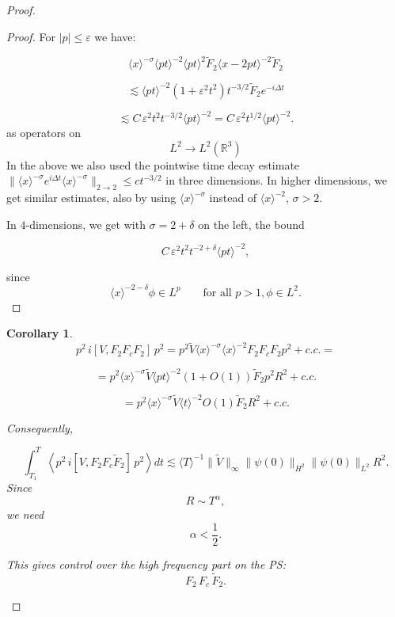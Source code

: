 \documentclass[11pt]{article}
\newtheorem{corollary}[theorem]{Corollary}
\begin{document}
\begin{proof}
\begin{proof}
For $|p|\le \varepsilon$ we have:

\[
\langle x\rangle^{-\sigma}\langle pt\rangle^{-2}\langle pt\rangle^{2}\widetilde F_2\langle x-2pt\rangle^{-2}\widetilde F_2
\]

\[
\lesssim\langle pt\rangle^{-2}(1+\varepsilon^2 t^2)t^{-3/2}\widetilde F_2e^{-i\Delta t}
\]


\[
\lesssim C\,\varepsilon^2t^2t^{-3/2}\langle pt\rangle^{-2}=C\,\varepsilon^{2}t^{1/2}\langle pt\rangle^{-2}.
\]
as operators on
\[
L^2 \to L^2(\mathbb{R}^3)
\]
In the above we also used the pointwise time decay estimate $\|\langle x\rangle^{-\sigma} e^{i\Delta t}\langle x\rangle^{-\sigma}\|_{2\rightarrow 2} \leq ct^{-3/2}$ in three dimensions.
In higher dimensions, we get similar estimates,
also by using $\langle x\rangle^{-\sigma}$ instead of
$\langle x\rangle^{-2}$, $\sigma>2$.

In $4$-dimensions, we get with
$\sigma=2+\delta$ on the left, the bound

\[
C\,\varepsilon^2t^2t^{-2+\delta}\langle pt\rangle^{-2},
\]

since
\[
\langle x\rangle^{-2-\delta}\phi\in L^p\qquad\text{for all } p>1, \phi \in L^2.
\]
\end{proof}
\begin{corollary}

\begin{equation}
p^2\,i[V,F_2F_c F_2]\,p^2
=
p^2
\widetilde V
\langle x\rangle^{-\sigma}
\langle x\rangle^{-2} F_2 F_c  F_2 p^2+c.c.=
\end{equation}

\[
=p^2\langle x\rangle^{-\sigma}\widetilde V\langle pt\rangle^{-2}(1+O(1))\widetilde F_2p^2R^2+c.c.
\]

\[
=p^2\langle x\rangle^{-\sigma}\widetilde V\langle t\rangle^{-2}O(1)\widetilde F_2R^2+c.c.
\]

Consequently,

\begin{equation}
\int_{T_1}^{T}\left<p^2\,i[V,F_2F_c\widetilde F_2]\,p^2\right>dt\lesssim\langle T\rangle^{-1}\|\widetilde V\|_{\infty}\|\psi(0)\|_{H^2}\|\psi(0)\|_{L^2}R^2.
\end{equation}
Since
\[
R\sim T^\alpha,
\]
we need
\[
\alpha<\frac12.
\]

This gives control over the high frequency
part on the PS:
\[
F_2\,F_c\,\widetilde F_2.
\]
\end{corollary}




\end{proof}
\end{document}
